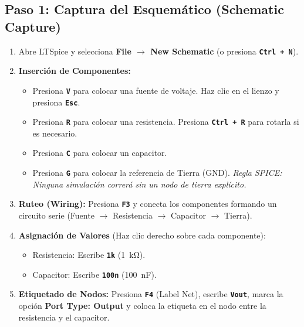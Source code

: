 \documentclass[11pt,a4paper]{article}
\newcommand{\tecla}[1]{\colorbox{gray!20}{\texttt{\footnotesize\textbf{#1}}}}
\newcommand{\menu}[1]{\textbf{\textsf{#1}}}
\begin{document}
\subsection*{Paso 1: Captura del Esquemático (Schematic Capture)}
\begin{enumerate}
    \item Abre LTSpice y selecciona \menu{File $\rightarrow$ New Schematic} (o presiona \tecla{Ctrl + N}).
    \item \textbf{Inserción de Componentes:}
    \begin{itemize}[label=\raisebox{0.25ex}{\tiny$\bullet$}]
        \item Presiona \tecla{V} para colocar una fuente de voltaje. Haz clic en el lienzo y presiona \tecla{Esc}.
        \item Presiona \tecla{R} para colocar una resistencia. Presiona \tecla{Ctrl + R} para rotarla si es necesario.
        \item Presiona \tecla{C} para colocar un capacitor.
        \item Presiona \tecla{G} para colocar la referencia de Tierra (GND). \textit{Regla SPICE: Ninguna simulación correrá sin un nodo de tierra explícito.}
    \end{itemize}
    \item \textbf{Ruteo (Wiring):} Presiona \tecla{F3} y conecta los componentes formando un circuito serie (Fuente $\rightarrow$ Resistencia $\rightarrow$ Capacitor $\rightarrow$ Tierra).
    \item \textbf{Asignación de Valores} (Haz clic derecho sobre cada componente):
    \begin{itemize}[label=\raisebox{0.25ex}{\tiny$\bullet$}]
        \item Resistencia: Escribe \tecla{1k} (\qty{1}{\kilo\ohm}).
        \item Capacitor: Escribe \tecla{100n} (\qty{100}{\nano\farad}).
    \end{itemize}
    \item \textbf{Etiquetado de Nodos:} Presiona \tecla{F4} (Label Net), escribe \tecla{Vout}, marca la opción \menu{Port Type: Output} y coloca la etiqueta en el nodo entre la resistencia y el capacitor.
\end{enumerate}
\end{document}
